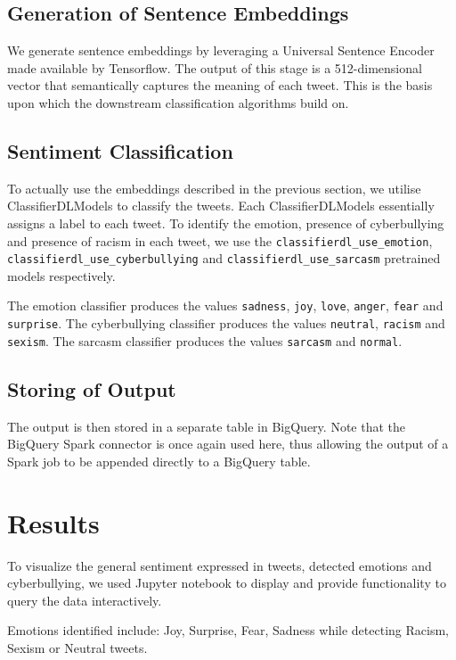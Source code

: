 \documentclass[a4paper,12pt]{article}
\begin{document}
\subsection{Generation of Sentence Embeddings}
\label{sec:sentence-embeddings}

We generate sentence embeddings by leveraging a Universal Sentence Encoder\cite{semanticSimilarity} made available by
Tensorflow. The output of this stage is a 512-dimensional vector that semantically captures the meaning of each tweet.
This is the basis upon which the downstream classification algorithms build on.

\subsection{Sentiment Classification}
To actually use the embeddings described in the previous section, we utilise ClassifierDLModels\cite{ClassifierDLModel}
to classify the tweets. Each ClassifierDLModels essentially assigns a label to each tweet. To identify the emotion,
presence of cyberbullying and presence of racism in each tweet, we use the \texttt{classifierdl\_use\_emotion},
\texttt{classifierdl\_use\_cyberbullying} and \texttt{classifierdl\_use\_sarcasm} pretrained models respectively.

The emotion classifier produces the values \texttt{sadness}, \texttt{joy}, \texttt{love}, \texttt{anger},
\texttt{fear} and \texttt{surprise}. The cyberbullying classifier produces the values \texttt{neutral},
\texttt{racism} and \texttt{sexism}. The sarcasm classifier produces the values \texttt{sarcasm} and \texttt{normal}.

\subsection{Storing of Output}
The output is then stored in a separate table in BigQuery. Note that the BigQuery Spark connector is once again used here, thus allowing the output of a Spark job to be appended directly to a BigQuery table.

\section{Results}
To visualize the general sentiment expressed in tweets, detected emotions and cyberbullying, we used Jupyter notebook to
display and provide functionality to query the data interactively.

Emotions identified include: Joy, Surprise, Fear, Sadness while detecting Racism, Sexism or Neutral tweets.
\end{document}
